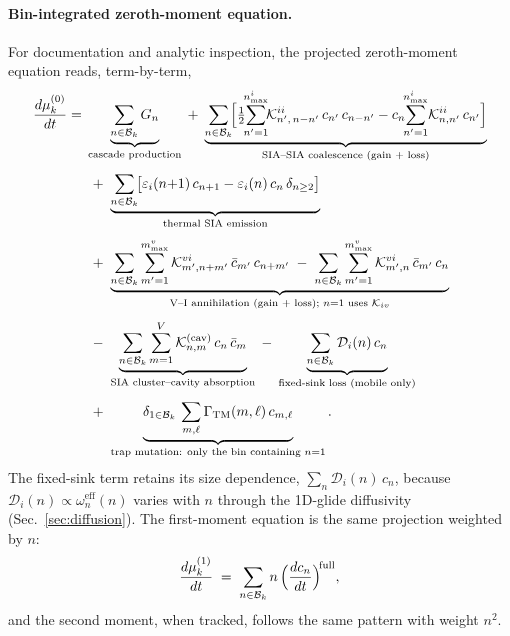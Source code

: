 \paragraph{Bin-integrated zeroth-moment equation.}
For documentation and analytic inspection, the projected
zeroth-moment equation reads, term-by-term,
\begin{equation}\label{eq:mu0_eq}
\begin{split}
    \frac{d\mu_k^{(0)}}{dt} = {} &
    \underbrace{
      \sum_{n \in \mathcal{B}_k} G_n
    }_{\text{cascade production}}
    \;+\; \underbrace{
      \sum_{n \in \mathcal{B}_k}\!\Bigl[
        \tfrac{1}{2}\!\!\sum_{n'=1}^{n_{\max}^i}\!\!
          \mathcal{K}_{n',\,n-n'}^{ii}\,c_{n'}\,c_{n-n'}
        - c_n\!\!\sum_{n'=1}^{n_{\max}^i}\!
          \mathcal{K}_{n,n'}^{ii}\,c_{n'}
      \Bigr]
    }_{\text{SIA--SIA coalescence (gain + loss)}}
    \\[4pt]
    & \;+\; \underbrace{
      \sum_{n \in \mathcal{B}_k}\!\bigl[
        \varepsilon_i(n{+}1)\,c_{n+1}
        - \varepsilon_i(n)\,c_n\,\delta_{n \ge 2}
      \bigr]
    }_{\text{thermal SIA emission}}
    \\[4pt]
    & \;+\; \underbrace{
      \sum_{n \in \mathcal{B}_k}\sum_{m'=1}^{m_{\max}^v}
        \mathcal{K}_{m',n+m'}^{vi}\,\bar{c}_{m'}\,c_{n+m'}
      \;-\; \sum_{n \in \mathcal{B}_k}\sum_{m'=1}^{m_{\max}^v}
        \mathcal{K}_{m',n}^{vi}\,\bar{c}_{m'}\,c_n
    }_{\text{V--I annihilation (gain + loss); $n{=}1$ uses $\mathcal{K}_{iv}$}}
    \\[4pt]
    & \;-\; \underbrace{
      \sum_{n \in \mathcal{B}_k}\sum_{m=1}^{V}
        \mathcal{K}_{n,m}^{(\mathrm{cav})}\,c_n\,\bar{c}_m
    }_{\text{SIA cluster--cavity absorption}}
    \;-\; \underbrace{
      \sum_{n \in \mathcal{B}_k} \mathcal{D}_i(n)\,c_n
    }_{\text{fixed-sink loss (mobile only)}}
    \\[4pt]
    & \;+\; \underbrace{
      \delta_{1 \in \mathcal{B}_k}\,
        \sum_{m,\ell}\Gamma_{\mathrm{TM}}(m,\ell)\,c_{m,\ell}
    }_{\text{trap mutation: only the bin containing $n{=}1$}}.
\end{split}
\end{equation}
The fixed-sink term retains its size dependence,
$\sum_n \mathcal{D}_i(n)\,c_n$, because
$\mathcal{D}_i(n) \propto \omega_n^{\mathrm{eff}}(n)$ varies with $n$
through the 1D-glide diffusivity (Sec.~\ref{sec:diffusion}).
The first-moment equation is the same projection weighted by $n$:
\begin{equation}\label{eq:mu1_eq}
    \frac{d\mu_k^{(1)}}{dt}
    \;=\; \sum_{n \in \mathcal{B}_k} n\,
        \Bigl(\frac{dc_n}{dt}\Bigr)^{\!\mathrm{full}},
\end{equation}
and the second moment, when tracked, follows the same pattern with
weight $n^2$.

